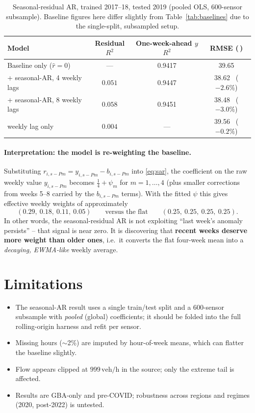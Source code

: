 \documentclass[11pt]{article}
\newcommand{\veh}{\,\text{veh/h}}
\begin{document}
\begin{table}[H]
\centering
\caption{Seasonal-residual AR, trained 2017--18, tested 2019
(pooled OLS, 600-sensor subsample). Baseline figures here differ slightly from
Table~\ref{tab:baselines} due to the single-split, subsampled setup.}
\label{tab:sar}
\begin{tabular}{lccc}
\toprule
Model & Residual $R^2$ & One-week-ahead $y$ $R^2$ & RMSE (\veh) \\
\midrule
Baseline only ($\hat r=0$)        & ---     & 0.9417 & 39.65 \\
\;+ seasonal-AR, 4 weekly lags    & $0.051$ & 0.9447 & 38.62 \ ($-2.6\%$) \\
\;+ seasonal-AR, 8 weekly lags    & $0.058$ & 0.9451 & 38.48 \ ($-3.0\%$) \\
\;1 weekly lag only               & $0.004$ & ---    & 39.56 \ ($-0.2\%$) \\
\bottomrule
\end{tabular}
\end{table}

\paragraph{Interpretation: the model is re-weighting the baseline.} Substituting
$r_{i,s-Pm}=y_{i,s-Pm}-b_{i,s-Pm}$ into \eqref{eq:sar}, the coefficient on the
raw weekly value $y_{i,s-Pm}$ becomes $\tfrac14+\psi_m$ for $m=1,\dots,4$ (plus
smaller corrections from weeks 5--8 carried by the $b_{i,s-Pm}$ terms). With the
fitted $\psi$ this gives effective weekly weights of approximately
\[
(0.29,\ 0.18,\ 0.11,\ 0.05)
\qquad\text{versus the flat}\qquad
(0.25,\ 0.25,\ 0.25,\ 0.25).
\]
In other words, the seasonal-residual AR is not exploiting
``last week's anomaly persists'' -- that signal is near zero. It is discovering
that \textbf{recent weeks deserve more weight than older ones}, i.e.\ it converts
the flat four-week mean into a \emph{decaying, EWMA-like} weekly average.

\section{Limitations}
\label{sec:limits}
\begin{itemize}
\item The seasonal-AR result uses a single train/test split and a 600-sensor
  subsample with \emph{pooled} (global) coefficients; it should be folded into
  the full rolling-origin harness and refit per sensor.
\item Missing hours ($\sim$2\%) are imputed by hour-of-week means, which can
  flatter the baseline slightly.
\item Flow appears clipped at $999\veh$ in the source; only the extreme tail is
  affected.
\item Results are GBA-only and pre-COVID; robustness across regions and regimes
  (2020, post-2022) is untested.
\end{itemize}
\end{document}
